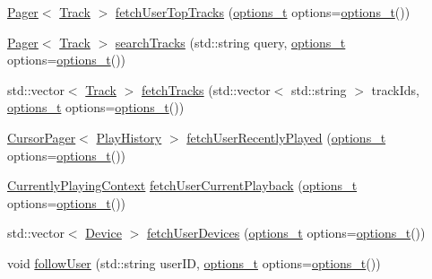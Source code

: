\begin{DoxyCompactItemize}
\item 
\mbox{\hyperlink{class_pager}{Pager}}$<$ \mbox{\hyperlink{class_track}{Track}} $>$ \mbox{\hyperlink{class_spotify_a_p_i_a6a15e5d679338e4bc8de8b6e74825d9c}{fetch\+User\+Top\+Tracks}} (\mbox{\hyperlink{_spotify_a_p_i_8h_a0ff5cac1a4007bb330b7d9939650c283}{options\+\_\+t}} options=\mbox{\hyperlink{_spotify_a_p_i_8h_a0ff5cac1a4007bb330b7d9939650c283}{options\+\_\+t}}())
\item 
\mbox{\hyperlink{class_pager}{Pager}}$<$ \mbox{\hyperlink{class_track}{Track}} $>$ \mbox{\hyperlink{class_spotify_a_p_i_a0ff3c9b7fbf9e7a4a29c8a7f692daaf1}{search\+Tracks}} (std\+::string query, \mbox{\hyperlink{_spotify_a_p_i_8h_a0ff5cac1a4007bb330b7d9939650c283}{options\+\_\+t}} options=\mbox{\hyperlink{_spotify_a_p_i_8h_a0ff5cac1a4007bb330b7d9939650c283}{options\+\_\+t}}())
\item 
std\+::vector$<$ \mbox{\hyperlink{class_track}{Track}} $>$ \mbox{\hyperlink{class_spotify_a_p_i_aa075dad1790b6cdc0cbd29648b65bfef}{fetch\+Tracks}} (std\+::vector$<$ std\+::string $>$ track\+Ids, \mbox{\hyperlink{_spotify_a_p_i_8h_a0ff5cac1a4007bb330b7d9939650c283}{options\+\_\+t}} options=\mbox{\hyperlink{_spotify_a_p_i_8h_a0ff5cac1a4007bb330b7d9939650c283}{options\+\_\+t}}())
\item 
\mbox{\hyperlink{class_cursor_pager}{Cursor\+Pager}}$<$ \mbox{\hyperlink{class_play_history}{Play\+History}} $>$ \mbox{\hyperlink{class_spotify_a_p_i_a0a22873540c42da1e98a573d34613852}{fetch\+User\+Recently\+Played}} (\mbox{\hyperlink{_spotify_a_p_i_8h_a0ff5cac1a4007bb330b7d9939650c283}{options\+\_\+t}} options=\mbox{\hyperlink{_spotify_a_p_i_8h_a0ff5cac1a4007bb330b7d9939650c283}{options\+\_\+t}}())
\item 
\mbox{\hyperlink{class_currently_playing_context}{Currently\+Playing\+Context}} \mbox{\hyperlink{class_spotify_a_p_i_a8f3d3293f8ed58778360c0fe9e95dae1}{fetch\+User\+Current\+Playback}} (\mbox{\hyperlink{_spotify_a_p_i_8h_a0ff5cac1a4007bb330b7d9939650c283}{options\+\_\+t}} options=\mbox{\hyperlink{_spotify_a_p_i_8h_a0ff5cac1a4007bb330b7d9939650c283}{options\+\_\+t}}())
\item 
std\+::vector$<$ \mbox{\hyperlink{class_device}{Device}} $>$ \mbox{\hyperlink{class_spotify_a_p_i_abee264c9d301954c6628d1a0c3a18342}{fetch\+User\+Devices}} (\mbox{\hyperlink{_spotify_a_p_i_8h_a0ff5cac1a4007bb330b7d9939650c283}{options\+\_\+t}} options=\mbox{\hyperlink{_spotify_a_p_i_8h_a0ff5cac1a4007bb330b7d9939650c283}{options\+\_\+t}}())
\item 
void \mbox{\hyperlink{class_spotify_a_p_i_a9b47427d58da9c870860bf066430cb35}{follow\+User}} (std\+::string user\+ID, \mbox{\hyperlink{_spotify_a_p_i_8h_a0ff5cac1a4007bb330b7d9939650c283}{options\+\_\+t}} options=\mbox{\hyperlink{_spotify_a_p_i_8h_a0ff5cac1a4007bb330b7d9939650c283}{options\+\_\+t}}())

\end{DoxyCompactItemize}
